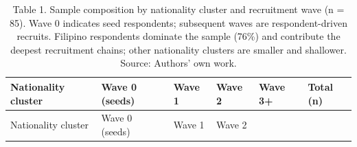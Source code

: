 \documentclass[
  12pt,
  letterpaper,
  DIV=11,
  numbers=noendperiod]{scrartcl}
\begin{document}
\begin{longtable}[]{@{}
  >{\raggedright\arraybackslash}p{}
  >{\centering\arraybackslash}p{}
  >{\centering\arraybackslash}p{}
  >{\centering\arraybackslash}p{}
  >{\centering\arraybackslash}p{}
  >{\centering\arraybackslash}p{}@{}}
\caption{Table 1. Sample composition by nationality cluster and
recruitment wave (n = 85). Wave 0 indicates seed respondents; subsequent
waves are respondent-driven recruits. Filipino respondents dominate the
sample (76\%) and contribute the deepest recruitment chains; other
nationality clusters are smaller and shallower. Source: Authors' own
work.}\label{tbl-sample-chars}\tabularnewline
\toprule\noalign{}
\begin{minipage}[b]{\linewidth}\raggedright
Nationality cluster
\end{minipage} & \begin{minipage}[b]{\linewidth}\centering
Wave 0 (seeds)
\end{minipage} & \begin{minipage}[b]{\linewidth}\centering
Wave 1
\end{minipage} & \begin{minipage}[b]{\linewidth}\centering
Wave 2
\end{minipage} & \begin{minipage}[b]{\linewidth}\centering
Wave 3+
\end{minipage} & \begin{minipage}[b]{\linewidth}\centering
Total (n)
\end{minipage} \\
\midrule\noalign{}
\endfirsthead
\toprule\noalign{}
\begin{minipage}[b]{\linewidth}\raggedright
Nationality cluster
\end{minipage} & \begin{minipage}[b]{\linewidth}\centering
Wave 0 (seeds)
\end{minipage} & \begin{minipage}[b]{\linewidth}\centering
Wave 1
\end{minipage} & \begin{minipage}[b]{\linewidth}\centering
Wave 2
\end{minipage} & \begin{minipage}[b]{\linewidth}\centering

\end{minipage}
\end{longtable}
\end{document}

